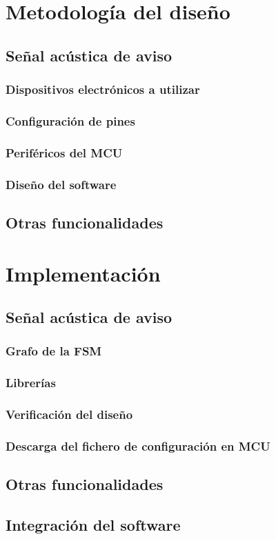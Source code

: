 \documentclass[a4paper]{article}
\begin{document}
\section{Metodología del diseño}

	\subsection{Señal acústica de aviso}
	
		\subsubsection{Dispositivos electrónicos a utilizar}
		
		\subsubsection{Configuración de pines}
		
		\subsubsection{Periféricos del MCU}
		
		\subsubsection{Diseño del software}
		
	\subsection{Otras funcionalidades}

\section{Implementación}

	\subsection{Señal acústica de aviso}
	
		\subsubsection{Grafo de la FSM}
		
		\subsubsection{Librerías}
		
		\subsubsection{Verificación del diseño}
		
		\subsubsection{Descarga del fichero de configuración en MCU}
		
	\subsection{Otras funcionalidades}
	
	\subsection{Integración del software}
	


\appendix
\end{document}
